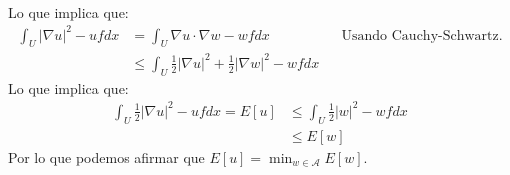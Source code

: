 \begin{homeworkProblem}
\begin{solucion}
\begin{align*}
    \end{align*}
    Lo que implica que:
    \begin{align*}
      \int_{U}|\nabla u|^2 -ufdx&=\int_{U}\nabla u\cdot \nabla w-wfdx && \text{Usando Cauchy-Schwartz.}\\
      &\leq \int_{U}\frac{1}{2}|\nabla u|^2+\frac{1}{2}|\nabla w|^2-wf dx
    \end{align*}
    Lo que implica que:
    \begin{align*}
      \int_{U}\frac{1}{2}|\nabla u|^2-ufdx=E[u]&\leq \int_{U}\frac{1}{2}|w|^2-wfdx\\
      &\leq E[w]
    \end{align*}
    Por lo que podemos afirmar que $E[u]=\min_{w\in\mathcal{A}}E[w]$.
    \demostrado
  \end{solucion}
\end{homeworkProblem}

